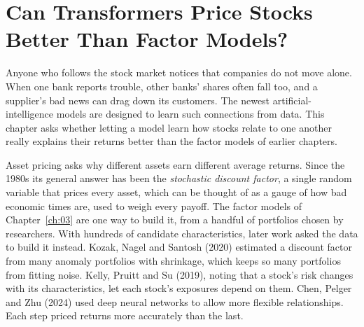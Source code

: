 \makeatletter
{}
\makeatother

\makeatletter
\makeatother

\chapter{Can Transformers Price Stocks Better Than Factor Models?}
\label{ch:22}
\providecommand{\term}[1]{\emph{#1}}

Anyone who follows the stock market notices that companies do not move alone. When one bank reports trouble, other banks' shares often fall too, and a supplier's bad news can drag down its customers. The newest artificial-intelligence models are designed to learn such connections from data. This chapter asks whether letting a model learn how stocks relate to one another really explains their returns better than the factor models of earlier chapters.

Asset pricing asks why different assets earn different average returns. Since the 1980s its general answer has been the \term{stochastic discount factor}, a single random variable that prices every asset, which can be thought of as a gauge of how bad economic times are, used to weigh every payoff. The factor models of Chapter~\ref{ch:03} are one way to build it, from a handful of portfolios chosen by researchers. With hundreds of candidate characteristics, later work asked the data to build it instead. Kozak, Nagel and Santosh (2020) estimated a discount factor from many anomaly portfolios with shrinkage, which keeps so many portfolios from fitting noise. Kelly, Pruitt and Su (2019), noting that a stock's risk changes with its characteristics, let each stock's exposures depend on them. Chen, Pelger and Zhu (2024) used deep neural networks to allow more flexible relationships. Each step priced returns more accurately than the last.

